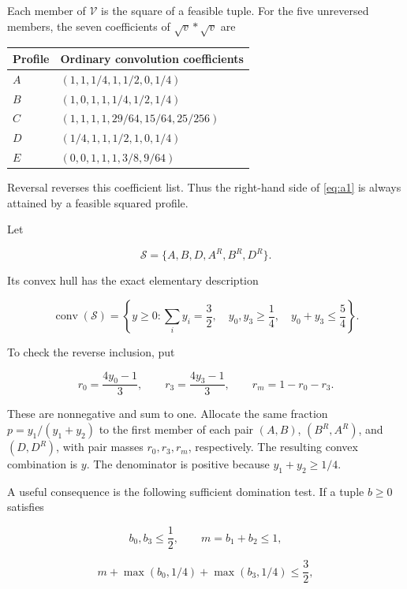 Each member of \(\mathcal V\) is the square of a feasible tuple. For the five
unreversed members, the seven coefficients of \(\sqrt v*\sqrt v\) are

\begin{center}
\begin{tabular}{ll}
\toprule
Profile & Ordinary convolution coefficients\\
\midrule
\(A\) & \((1,1,1/4,1,1/2,0,1/4)\)\\
\(B\) & \((1,0,1,1,1/4,1/2,1/4)\)\\
\(C\) & \((1,1,1,1,29/64,15/64,25/256)\)\\
\(D\) & \((1/4,1,1,1/2,1,0,1/4)\)\\
\(E\) & \((0,0,1,1,1,3/8,9/64)\)\\
\bottomrule
\end{tabular}
\end{center}

Reversal reverses this coefficient list. Thus the right-hand side of \eqref{eq:a1} is
always attained by a feasible squared profile.

Let

\[
\mathcal S=\{A,B,D,A^R,B^R,D^R\}.
\]

Its convex hull has the exact elementary description

\begin{equation}\label{eq:a4}
\operatorname{conv}(\mathcal S)=
\left\{y\ge0:
\sum_i y_i=\frac32,\quad y_0,y_3\ge\frac14,\quad
y_0+y_3\le\frac54\right\}.
\end{equation}

To check the reverse inclusion, put

\[
r_0=\frac{4y_0-1}{3},\qquad
r_3=\frac{4y_3-1}{3},\qquad r_m=1-r_0-r_3.
\]

These are nonnegative and sum to one. Allocate the same fraction
\(p=y_1/(y_1+y_2)\) to the first member of each pair
\((A,B)\), \((B^R,A^R)\), and \((D,D^R)\), with pair masses
\(r_0,r_3,r_m\), respectively. The resulting convex combination is \(y\).
The denominator is positive because \(y_1+y_2\ge1/4\).

A useful consequence is the following sufficient domination test. If a tuple
\(b\ge0\) satisfies

\[
b_0,b_3\le\frac12,\qquad m=b_1+b_2\le1,
\]

\begin{equation}\label{eq:a5}
m+\max(b_0,1/4)+\max(b_3,1/4)\le\frac32,
\end{equation}

